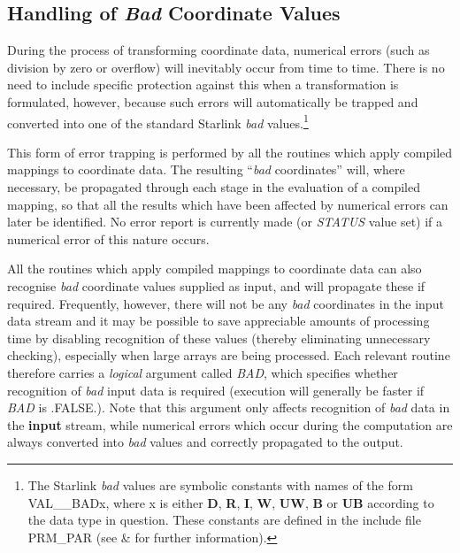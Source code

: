 \documentclass[twoside,nolof,11pt]{starlink}
\providecommand{\name}[1]{\small{#1}}
\providecommand{\fortvar}[1]{\emph{#1}}
\begin{document}
\subsection{Handling of \emph{Bad} Coordinate Values}

\label{section:additional:badvalues}

During the process of transforming coordinate data, numerical errors (such
as division by zero or overflow) will inevitably occur from time to time.
There is no need to include specific protection against this when a
transformation is formulated, however, because such errors will
automatically be trapped and converted into one of the standard Starlink
\emph{bad} values.\footnote{
The Starlink \emph{bad} values are symbolic constants with names of the form
\name{VAL\_\_BADx}, where x is either \textbf{D}, \textbf{R}, \textbf{I},
\textbf{W}, \textbf{UW}, \textbf{B} or \textbf{UB} according to the data
type in question.
These constants are defined in the include file \name{PRM\_PAR} (see
\&  for further information).}

This form of error trapping is performed by all the routines which apply
compiled mappings to coordinate data.
The resulting ``\emph{bad} coordinates'' will, where necessary, be propagated
through each stage in the evaluation of a compiled mapping, so that all the
results which have been affected by numerical errors can later be
identified.
No error report is currently made (or \fortvar{STATUS} value set) if a
numerical error of this nature occurs.

All the routines which apply compiled mappings to coordinate data can also
recognise \emph{bad} coordinate values supplied as input, and will propagate
these if required.
Frequently, however, there will not be any \emph{bad} coordinates in the
input data stream and it may be possible to save appreciable amounts of
processing time by disabling recognition of these values (thereby
eliminating unnecessary checking), especially when large arrays are being
processed.
Each relevant routine therefore carries a \emph{logical} argument called
\fortvar{BAD}, which specifies whether recognition of \emph{bad} input data
is required (execution will generally be faster if \fortvar{BAD} is
\name{.FALSE.}).
Note that this argument only affects recognition of \emph{bad} data in the
\textbf{input} stream, while numerical errors which occur during the
computation are always converted into \emph{bad} values and correctly
propagated to the output.
\end{document}
